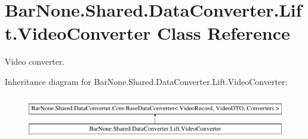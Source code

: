 \hypertarget{class_bar_none_1_1_shared_1_1_data_converter_1_1_lift_1_1_video_converter}{}\section{Bar\+None.\+Shared.\+Data\+Converter.\+Lift.\+Video\+Converter Class Reference}
\label{class_bar_none_1_1_shared_1_1_data_converter_1_1_lift_1_1_video_converter}


Video converter.  


Inheritance diagram for Bar\+None.\+Shared.\+Data\+Converter.\+Lift.\+Video\+Converter\+:\begin{figure}[H]
\begin{center}
\leavevmode
\includegraphics[height=1.908007cm]{class_bar_none_1_1_shared_1_1_data_converter_1_1_lift_1_1_video_converter}
\end{center}
\end{figure}

